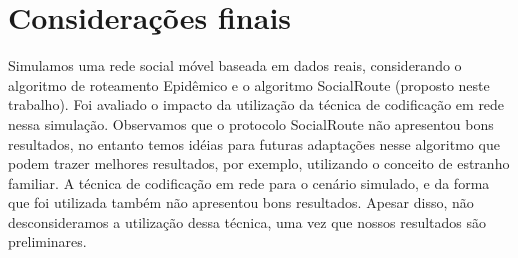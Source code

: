 \section{Considerações finais}

Simulamos uma rede social móvel baseada em dados reais, considerando o
algoritmo de roteamento Epidêmico e o algoritmo SocialRoute (proposto
neste trabalho). Foi avaliado o impacto da utilização da técnica de
codificação em rede nessa simulação. Observamos que o protocolo
SocialRoute não apresentou bons resultados, no entanto temos idéias para
futuras adaptações nesse algoritmo que podem trazer melhores resultados,
por exemplo, utilizando o conceito de estranho familiar. A técnica de
codificação em rede para o cenário simulado, e da forma que foi
utilizada também não apresentou bons resultados. Apesar disso, não
desconsideramos a utilização dessa técnica, uma vez que nossos
resultados são preliminares.
